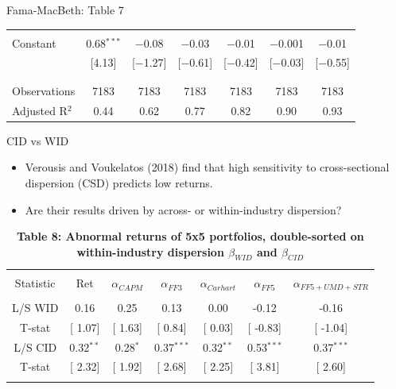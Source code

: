 \documentclass{beamer}
\begin{document}
{\begin{frame}{Fama-MacBeth: Table 7}
\begin{table}[!htbp]
\begin{tabular}{@{\extracolsep{5pt}}lcccccc}
  & & & & & & \\ 
 Constant & 0.68$^{***}$ & $-$0.08 & $-$0.03 & $-$0.01 & $-$0.001 & $-$0.01 \\ 
  & [4.13] & [$-$1.27] & [$-$0.61] & [$-$0.42] & [$-$0.03] & [$-$0.55] \\ 
  & & & & & & \\ 
\hline \\[-1.0ex] 
Observations & 7183 & 7183 & 7183 & 7183 & 7183 & 7183 \\ 
Adjusted R$^{2}$ & 0.44 & 0.62 & 0.77 & 0.82 & 0.90 & 0.93 \\ 
\hline 
\end{tabular} 
\end{table}
\end{frame}
}


\normalsize
\begin{frame}{CID vs WID}
\begin{itemize}
    \item {Verousis and Voukelatos (2018) find that high sensitivity to cross-sectional dispersion (CSD) predicts low returns.}
    \item {Are their results driven by across- or within-industry dispersion?}
\end{itemize}
\scriptsize
\begin{table}[!htbp] \centering 
  \caption*{\textbf{Table 8: Abnormal returns of 5x5 portfolios, double-sorted on within-industry dispersion $\beta_{WID}$ and $\beta_{CID}$}} 
  \label{} 
\begin{tabular}{@{\extracolsep{5pt}} ccccccc} 
\\[-1.8ex]\hline 
\hline \\[-1.8ex] 
Statistic & Ret & $\alpha_{CAPM}$ & $\alpha_{FF3}$ & $\alpha_{Carhart}$ & $\alpha_{FF5}$ & $\alpha_{FF5+UMD+STR}$ \\ 
\hline \\[-1.8ex] 
L/S WID & 0.16 & 0.25 & 0.13 & 0.00 & -0.12 & -0.16 \\ 
T-stat & [ 1.07] & [ 1.63] & [ 0.84] & [ 0.03] & [ -0.83] & [ -1.04] \\ 
L/S CID & 0.32$^{**}$ & 0.28$^{*}$ & 0.37$^{***}$ & 0.32$^{**}$ & 0.53$^{***}$ & 0.37$^{***}$ \\ 
T-stat & [ 2.32] & [ 1.92] & [ 2.68] & [ 2.25] & [ 3.81] & [ 2.60] \\ 
\hline \\[-1.8ex] 
\end{tabular} 
\end{table}
\end{frame}
\end{document}
